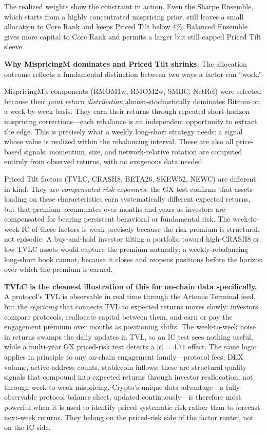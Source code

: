 \documentclass[11pt,a4paper]{article}
\begin{document}
The realized weights show the constraint in action. Even the Sharpe Ensemble, which starts from a highly concentrated mispricing prior, still leaves a small allocation to Core Rank and keeps Priced Tilt below 4\%. Balanced Ensemble gives more capital to Core Rank and permits a larger but still capped Priced Tilt sleeve.

\begin{callout}
\textbf{Why MispricingM dominates and Priced Tilt shrinks.}\; The allocation outcome reflects a fundamental distinction between two ways a factor can ``work.''

MispricingM's components (RMOM1w, RMOM2w, SMBC, NetRel) were selected because their \emph{joint return distribution} almost-stochastically dominates Bitcoin on a week-by-week basis. They earn their returns through repeated short-horizon mispricing corrections---each rebalance is an independent opportunity to extract the edge. This is precisely what a weekly long-short strategy needs: a signal whose value is realized within the rebalancing interval. These are also all price-based signals: momentum, size, and network-relative rotation are computed entirely from observed returns, with no exogenous data needed.

Priced Tilt factors (TVLC, CRASH8, BETA26, SKEW52, NEWC) are different in kind. They are \emph{compensated risk exposures}: the GX test confirms that assets loading on these characteristics earn systematically different expected returns, but that premium accumulates over months and years as investors are compensated for bearing persistent behavioral or fundamental risk. The week-to-week IC of these factors is weak precisely because the risk premium is structural, not episodic. A buy-and-hold investor tilting a portfolio toward high-CRASH8 or low-TVLC assets would capture the premium naturally; a weekly-rebalancing long-short book cannot, because it closes and reopens positions before the horizon over which the premium is earned.

\textbf{TVLC is the cleanest illustration of this for on-chain data specifically.} A protocol's TVL is observable in real time through the Artemis Terminal feed, but the \emph{repricing} that connects TVL to expected returns moves slowly: investors compare protocols, reallocate capital between them, and earn or pay the engagement premium over months as positioning shifts. The week-to-week noise in returns swamps the daily updates in TVL, so an IC test sees nothing useful, while a multi-year GX priced-risk test detects a $|t|=4.71$ effect. The same logic applies in principle to any on-chain engagement family---protocol fees, DEX volume, active-address counts, stablecoin inflows: these are structural quality signals that compound into expected returns through investor reallocation, not through week-to-week mispricing. Crypto's unique data advantage---a fully observable protocol balance sheet, updated continuously---is therefore most powerful when it is used to identify priced systematic risk rather than to forecast next-week returns. They belong on the priced-risk side of the factor router, not on the IC side.


\end{callout}
\end{document}

